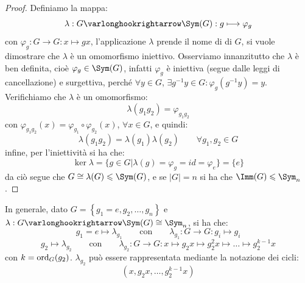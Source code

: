 \documentclass[11pt]{scrartcl}
\begin{document}
\begin{proof}
    Definiamo la mappa:
        \[ \lambda : G \varlonghookrightarrow \Sym(G) : g \longmapsto \varphi_g
            \]
    con $\varphi_g : G \longrightarrow G : x \longmapsto gx$, l'applicazione $\lambda$ prende il nome di  di $G$, si 
    vuole dimostrare che $\lambda$ è un omomorfismo iniettivo.
    Osserviamo innanzitutto che $\lambda$ è ben definita, cioè $\varphi_g \in \Sym(G)$, infatti $\varphi_g$ è iniettiva (segue dalle leggi di cancellazione) e 
    surgettiva, perché $\forall y \in G$, $\exists g^{-1}y \in G : \varphi_g(g^{-1}y) = y$. Verifichiamo che $\lambda$ è un omomorfismo:
        \[ \lambda(g_1g_2) = \varphi_{g_1g_2}
            \]
    con $\varphi_{g_1g_2} (x) = \varphi_{g_1} \circ \varphi_{g_2} (x)$, $\forall x \in G$, e quindi:
        \[ \lambda(g_1g_2) = \lambda(g_1) \lambda(g_2)
        \qquad \forall g_1,g_2 \in G
            \]
    infine, per l'iniettività si ha che:
        \[ \ker \lambda = \{g \in G | \lambda(g) = \varphi_g = id = \varphi_e\} = \{e\}
            \]
    da ciò segue che $G \cong \lambda(G) \leqslant \Sym(G)$, e se $|G| = n$ si ha che $\Imm(G) \leqslant \Sym_n$.
\end{proof}

\begin{remark}
    In generale, dato $G = \left\{g_1 = e,g_2, \ldots, g_n\right\}$ e $\lambda : G \varlonghookrightarrow \Sym(G) \cong \Sym_n$, si ha che:
        \[ g_1 = e \longmapsto \lambda_{g_1} \qquad \text{con} \qquad \lambda_{g_1}: G \longrightarrow G : g_i \longmapsto g_i
            \]
        \[ g_2 \longmapsto \lambda_{g_2} \qquad \text{con} \qquad \lambda_{g_2} : G \longrightarrow G : x \longmapsto g_2x \longmapsto g_2^2x \longmapsto \ldots \longmapsto g_2^{k-1}x
            \]
        con $k = \operatorname{ord}_G(g_2)$. $\lambda_{g_2}$ può essere rappresentata mediante la notazione dei cicli:
            \[ (x,g_2x,\ldots,g_2^{k-1}x)
                \]
\end{remark}
\end{document}
